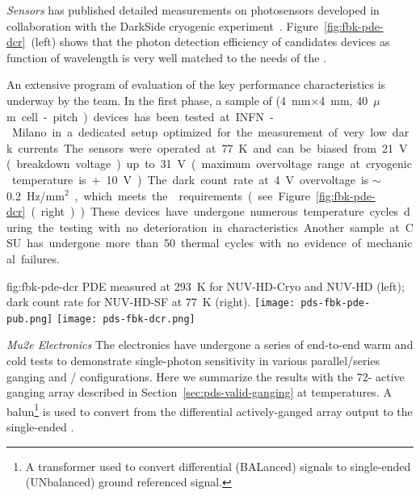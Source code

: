 \textit{ Sensors} 
 has published detailed measurements on photosensors developed in collaboration with the DarkSide cryogenic experiment~\cite{Gola:2019idb}. Figure~\ref{fig:fbk-pde-dcr}~(left) shows that the photon detection efficiency of candidates devices as function of wavelength is very well matched to the needs of the .

An extensive program of evaluation of the key performance characteristics is underway by the   team.
In the first phase, a sample of (\SI{4}{mm}$\times$\SI{4}{mm}, \SI{40}{$\mu$m} cell-pitch) devices has been tested at INFN-Milano in a dedicated setup optimized for the measurement of very low dark currents. The sensors were operated at \SI{77}{K} and can be biased from \SI{21}{V} (breakdown voltage) up to \SI{31}{V} (maximum overvoltage range at cryogenic temperature is +\SI{10}{V}). The dark count rate at \SI{+4}{V} overvoltage is $\sim$\SI{0.2}{Hz/mm$^2$}, which meets the  requirements (see Figure~\ref{fig:fbk-pde-dcr}~(right)). 
These devices have undergone numerous temperature cycles during the testing with no deterioration in characteristics. Another sample at CSU has undergone more than 50 thermal cycles with no evidence of mechanical failures.  

\begin{dunefigure}
 {fig:fbk-pde-dcr}
 {PDE measured at \SI{293}{K} for  NUV-HD-Cryo and NUV-HD  (left); dark count rate for NUV-HD-SF  at \SI{77}{K} (right).}
\texttt{[image: pds-fbk-pde-pub.png]}
\texttt{[image: pds-fbk-dcr.png]}
\end{dunefigure}


\textit{Mu2e Electronics}
The  electronics have undergone a series of end-to-end warm and cold tests to demonstrate single-photon sensitivity in various parallel/series ganging and / configurations. Here we summarize the results with the 72- active ganging array described in Section~\ref{sec:pds-valid-ganging}
 at  temperatures. 
A balun\footnote{A transformer used to convert differential (BALanced) signals to single-ended (UNbalanced) ground referenced signal.} is used to convert from the differential actively-ganged  array output to the single-ended .

